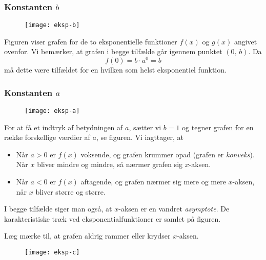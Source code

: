 \documentclass[12pt,oneside,a4paper]{article}
\begin{document}
\subsubsection{Konstanten $b$}
\begin{figure}[ht]
    \centering
    \texttt{[image: eksp-b]}
    \label{eksp-b}
\end{figure}

Figuren viser grafen for de to eksponentielle funktioner $f(x)$ og $g(x)$
angivet ovenfor. Vi bemærker, at grafen i begge tilfælde går igennem punktet
$(0, \,b)$.  Da
$$
f(0) = b\cdot a^0 = b
$$
må dette være tilfældet for en hvilken som helst eksponentiel funktion.

\subsubsection{Konstanten $a$}
\begin{figure}[ht]
    \centering
    \texttt{[image: eksp-a]}
    \label{eksp-a}
\end{figure}

For at få et indtryk af betydningen af $a$, sætter vi $b=1$ og tegner grafen
for en række forskellige værdier af $a$, se figuren. Vi iagttager, at 
\begin{itemize}
    \item Når $a>0$ er $f(x)$ voksende, og grafen krummer opad (grafen er {\em konveks}).
        Når $x$ bliver mindre og mindre, så nærmer grafen sig $x$-aksen.
    \item Når $a<0$ er $f(x)$ aftagende, og grafen nærmer sig mere og mere
        $x$-aksen, når $x$ bliver større og større.
\end{itemize}
I begge tilfælde siger man også, at $x$-aksen er en vandret {\em asymptote}.
De karakteristiske træk ved eksponentialfunktioner er samlet på figuren.

Læg mærke til, at grafen aldrig rammer eller krydser $x$-aksen.

\begin{figure}[ht]
    \centering
    \texttt{[image: eksp-c]}
    \label{eksp-c}
\end{figure}
\end{document}
